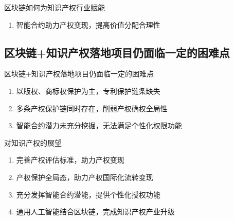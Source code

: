 \documentclass[11pt]{beamer}
\begin{document}
\begin{frame}{区块链如何为知识产权行业赋能}
\begin{enumerate}
		\item 智能合约助力产权变现，提高价值分配合理性
	\end{enumerate}
\end{frame}

\subsection{区块链+知识产权落地项目仍面临一定的困难点}

\begin{frame}{区块链+知识产权落地项目仍面临一定的困难点}
	\begin{enumerate}
		\item 以版权、商标权保护为主，专利保护链条缺失
		\item 多条产权保护链同时存在，削弱产权确权全局性
		\item 智能合约潜力未充分挖掘，无法满足个性化权限功能
	\end{enumerate}
\end{frame}

\begin{frame}{对知识产权的展望}
	\begin{enumerate}
		\item 完善产权评估标准，助力产权变现
		\item 产权保护全局态，助力产权国际化流转变现
		\item 充分发挥智能合约潜能，提供个性化授权功能
		\item 通用人工智能结合区块链，完成知识产权产业升级
	\end{enumerate}
\end{frame}
\end{document}
